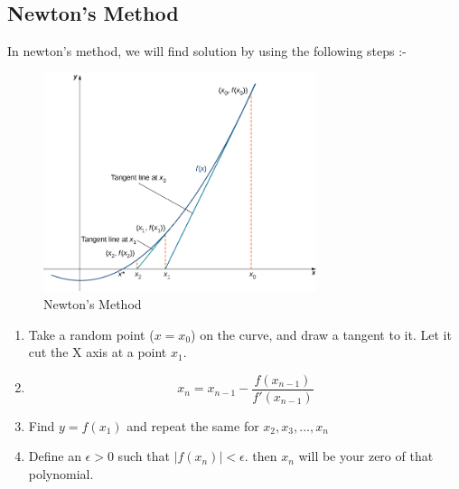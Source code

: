 \documentclass[12pt]{article}
\begin{document}
\subsection{Newton's Method}
In newton's method, we will find solution by using the following steps :-
\begin{figure}[H]
    \centering
    \includegraphics[width=8cm]{new.png}
    \caption{Newton's Method}
\end{figure}
\begin{enumerate}
    \item Take a random point ($x=x_0$) on the curve, and draw a tangent to it. Let it cut the X axis at a point $x_1$.
    \item \begin{equation*}
        x_n=x_{n-1} - \frac{f(x_{n-1})}{f'(x_{n-1})}
    \end{equation*}
    \item Find $y=f(x_1)$ and repeat the same for $x_2,x_3,...,x_n$
    \item Define an $\epsilon >0$ such that $|f(x_n)|<\epsilon$. then $x_n$ will be your zero of that polynomial.
\end{enumerate}
\end{document}
